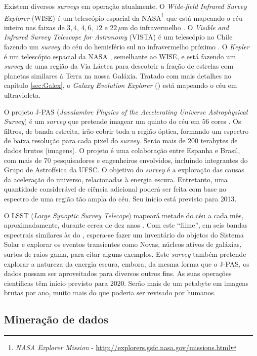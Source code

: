 Existem diversos {\em surveys} em operação atualmente. O {\em Wide-field
Infrared Survey Explorer} (WISE) é um telescópio espacial da NASA\footnote{{\em
NASA Explorer Mission} - \url{http://explorers.gsfc.nasa.gov/missions.html}} que
está mapeando o céu inteiro nas faixas de $3,4$, $4,6$, $12$ e
$22\,\mu\mathrm{m}$ do infravermelho \citep{Wright2010}. O {\em Visible and
Infrared Survey Telescope for Astronomy} (VISTA) é um telescópio no Chile
fazendo um {\em survey} do céu do hemisfério sul no infravermelho próximo
\citep{Born2010}. O {\em Kepler} é um telescópio espacial da NASA
\citep{Borucki2010}, semelhante ao WISE, e está fazendo um {\em survey} de uma
região da Via Láctea para descobrir a fração de estrelas com planetas similares
à Terra na nossa Galáxia. Tratado com mais detalhes no capítulo \ref{sec:Galex},
o {\em Galaxy Evolution Explorer} (\galex) está mapeando o céu em ultravioleta.

O projeto J-PAS ({\em Javalambre Physics of the Accelerating Universe
Astrophysical Survey}) é um {\em survey} que pretende imagear um quinto do céu
em $56$ cores \citep{Benitez2009}. Os filtros, de banda estreita, irão cobrir
toda a região óptica, formando um espectro de baixa resolução para cada pixel do {\em
survey}. Serão mais de $200$ terabytes de dados brutos (imagens). O projeto é
uma colaboração entre Espanha e Brasil, com mais de 70 pesquisadores e engenheiros
envolvidos, incluindo integrantes do Grupo de Astrofísica da UFSC. O objetivo do
{\em survey} é a exploração das causas da aceleração do universo, relacionadas à
energia escura. Entretanto, uma quantidade considerável de ciência adicional
poderá ser feita com base no espectro de uma região tão ampla do céu. Seu início
está previsto para 2013.

O LSST ({\em Large Synoptic Survey Telecope}) mapeará metade do céu a cada mês,
aproximadamente, durante cerca de dez anos \citep{Ivezic2008}. Com este
``filme'', em seis bandas espectrais similares às do \SDSS, espera-se fazer um
inventário do objetos do Sistema Solar e explorar os eventos transientes como
Novas, núcleos ativos de galáxias, surtos de raios gama, para citar alguns
exemplos. Este {\em survey} também pretende explorar a natureza da energia
escura, embora, da mesma forma que o J-PAS, os dados possam ser aproveitados
para diversos outros fins. As suas operações científicas têm início previsto
para 2020. Serão mais de um petabyte em imagens brutas por ano, muito mais do
que poderia ser revisado por humanos.

\subsection{Mineração de dados}

